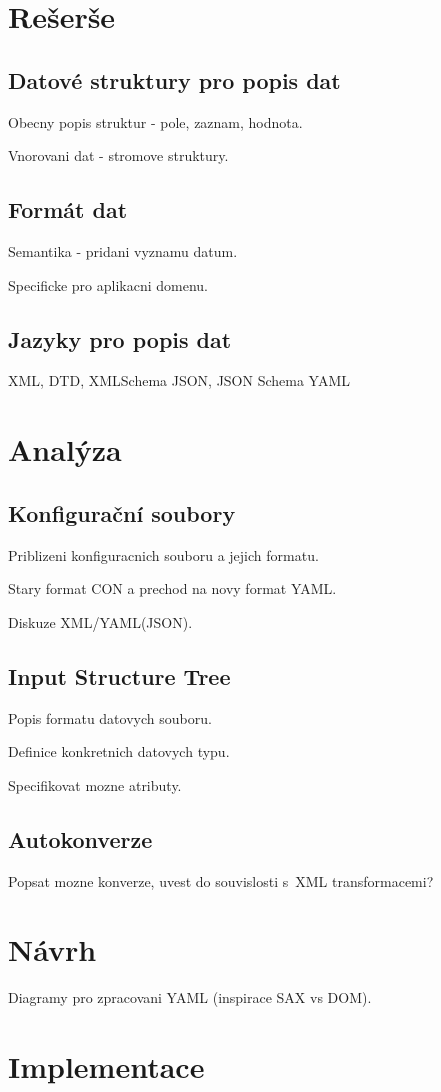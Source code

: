 \documentclass[FM,DP]{tulthesis}
\begin{document}


\chapter{Rešerše}

\section{Datové struktury pro popis dat}
Obecny popis struktur - pole, zaznam, hodnota.


Vnorovani dat - stromove struktury.


\section{Formát dat}
Semantika - pridani vyznamu datum.

Specificke pro aplikacni domenu.

\section{Jazyky pro popis dat}
XML, DTD, XMLSchema
JSON, JSON Schema
YAML


\chapter{Analýza}


\section{Konfigurační soubory}
Priblizeni konfiguracnich souboru a jejich formatu.

Stary format CON a prechod na novy format YAML.

Diskuze XML/YAML(JSON). 

\section{Input Structure Tree}
Popis formatu datovych souboru.

Definice konkretnich datovych typu.

Specifikovat mozne atributy.

\section{Autokonverze}
Popsat mozne konverze, uvest do souvislosti s~XML transformacemi?


\chapter{Návrh}
Diagramy pro zpracovani YAML (inspirace SAX vs DOM).




\chapter{Implementace}
\end{document}
